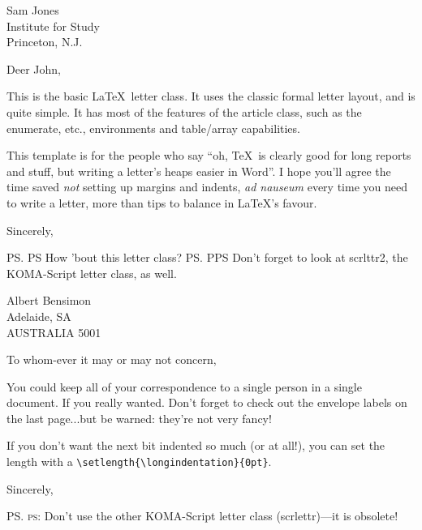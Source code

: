 \documentclass[a4paper,12pt]{letter}
\begin{document}
\begin{letter}{Sam Jones \\ Institute for Study\\ Princeton, N.J.} 

\opening{Deer John,} 

This is the basic \LaTeX\ letter class. It uses the classic formal letter layout, and is quite simple. It has most of the features of the \textsf{article} class, such as the enumerate, etc., environments and table/array capabilities.

This template is for the people who say ``oh, \TeX\ is clearly good for long reports and stuff, but writing a letter's heaps easier in Word''. I hope you'll agree the time saved \emph{not} setting up margins and indents, \textsl{ad nauseum} every time you need to write a letter, more than tips to balance in \LaTeX's favour.

\closing{Sincerely,}



\ps{PS How 'bout this letter class?}
\ps{PPS Don't forget to look at \textsf{scrlttr2}, the KOMA-Script letter class, as well.}

\end{letter}




\begin{letter}{Albert Bensimon\\Adelaide, SA\\AUSTRALIA 5001}

\opening{To whom-ever it may or may not concern,}

You could keep all of your correspondence to a single person in a single document. If you really wanted. Don't forget to check out the envelope labels on the last page...but be warned: they're not very fancy!

If you don't want the next bit indented so much (or at all!), you can set the length with a \verb|\setlength{\longindentation}{0pt}|.

\setlength{\longindentation}{0pt}

\closing{Sincerely,}

\ps{\textsc{ps}: Don't use the other KOMA-Script letter class (\textsf{scrlettr})---it is obsolete!}

\end{letter}
\end{document}
